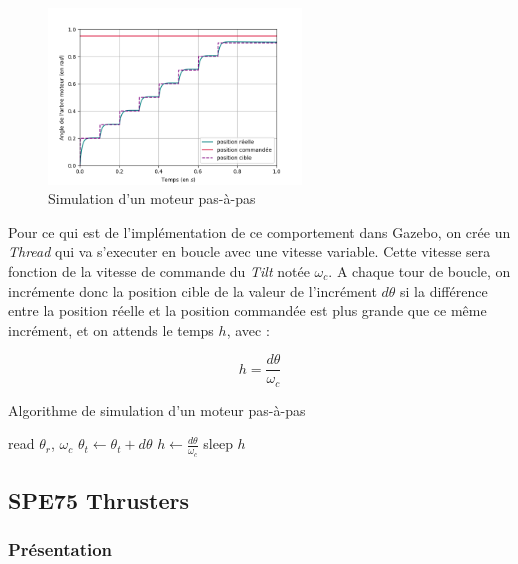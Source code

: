 				\begin{figure}[!htb]
					\centering
					\includegraphics[width=0.6\textwidth]{imgs/stepper_motor.png}
					\caption{Simulation d'un moteur pas-à-pas}
					\label{fig:tilt_position}
				\end{figure}
				
				Pour ce qui est de l'implémentation de ce comportement dans \gls{Gazebo}, on crée un \textit{Thread} qui va s'executer en boucle avec une vitesse variable. Cette vitesse sera fonction de la vitesse de commande du \textit{Tilt} notée $\omega_c$. A chaque tour de boucle, on incrémente donc la position cible de la valeur de l'incrément $d\theta$ si la différence entre la position réelle et la position commandée est plus grande que ce même incrément, et on attends le temps $h$, avec :

				$$h = \frac{d\theta}{\omega_c}$$

				\begin{algorithm}[!htb]
					\caption{Algorithme de simulation d'un moteur pas-à-pas}
					\label{algo:stepper_motor}
					\begin{algorithmic}
							\STATE read $\theta_r$, $\omega_c$
								\STATE $\theta_t \leftarrow \theta_t + d\theta$
							\ENDIF
							\STATE $h \leftarrow \frac{d\theta}{\omega_c}$
							\STATE sleep $h$
						\ENDWHILE
					\end{algorithmic}
				\end{algorithm}

		\subsection{SPE75 Thrusters}

			\subsubsection{Présentation}
	
